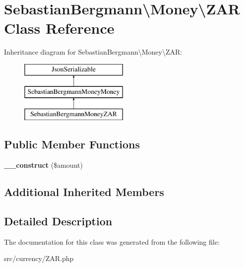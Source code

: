 \hypertarget{classSebastianBergmann_1_1Money_1_1ZAR}{}\section{Sebastian\+Bergmann\textbackslash{}Money\textbackslash{}Z\+A\+R Class Reference}
\label{classSebastianBergmann_1_1Money_1_1ZAR}
Inheritance diagram for Sebastian\+Bergmann\textbackslash{}Money\textbackslash{}Z\+A\+R\+:\begin{figure}[H]
\begin{center}
\leavevmode
\includegraphics[height=3.000000cm]{classSebastianBergmann_1_1Money_1_1ZAR}
\end{center}
\end{figure}
\subsection*{Public Member Functions}
\begin{DoxyCompactItemize}
\item 
\hypertarget{classSebastianBergmann_1_1Money_1_1ZAR_a7eab3a076254436427b3b1e617345ac7}{}{\bfseries \+\_\+\+\_\+construct} (\$amount)\label{classSebastianBergmann_1_1Money_1_1ZAR_a7eab3a076254436427b3b1e617345ac7}

\end{DoxyCompactItemize}
\subsection*{Additional Inherited Members}


\subsection{Detailed Description}


The documentation for this class was generated from the following file\+:\begin{DoxyCompactItemize}
\item 
src/currency/Z\+A\+R.\+php\end{DoxyCompactItemize}

